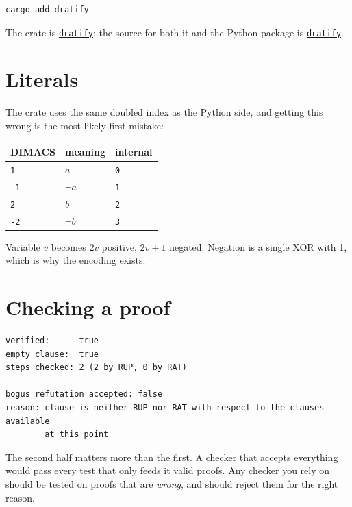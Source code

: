 \documentclass[11pt,a4paper]{article}
\newcommand{\crate}[1]{\href{https://crates.io/crates/#1}{\texttt{#1}}}
\newcommand{\repo}[1]{\href{https://github.com/carlok/#1}{\texttt{#1}}}
\begin{document}
\begin{lstlisting}[style=base]
cargo add dratify
\end{lstlisting}

\noindent The crate is \crate{dratify}; the source for both it and the Python
package is \repo{dratify}.

\section{Literals}

The crate uses the same doubled index as the Python side, and getting this
wrong is the most likely first mistake:

\begin{center}
\begin{tabular}{lll}
\toprule
DIMACS & meaning & internal \\
\midrule
\texttt{1}  & $a$       & \texttt{0} \\
\texttt{-1} & $\lnot a$ & \texttt{1} \\
\texttt{2}  & $b$       & \texttt{2} \\
\texttt{-2} & $\lnot b$ & \texttt{3} \\
\bottomrule
\end{tabular}
\end{center}

Variable $v$ becomes $2v$ positive, $2v{+}1$ negated. Negation is a single XOR
with 1, which is why the encoding exists.

\section{Checking a proof}



\begin{lstlisting}[style=out]
verified:      true
empty clause:  true
steps checked: 2 (2 by RUP, 0 by RAT)

bogus refutation accepted: false
reason: clause is neither RUP nor RAT with respect to the clauses available
        at this point
\end{lstlisting}

The second half matters more than the first. A checker that accepts everything
would pass every test that only feeds it valid proofs. Any checker you rely on
should be tested on proofs that are \emph{wrong}, and should reject them for
the right reason.
\end{document}
